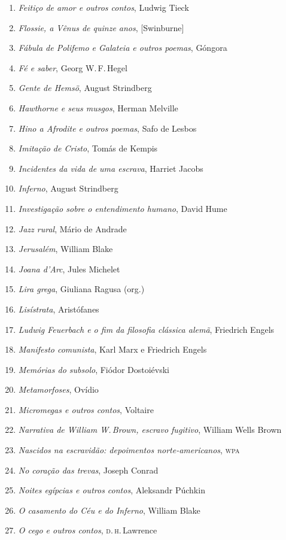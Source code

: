 \begin{enumerate}
\item \textit{Feitiço de amor e outros contos}, Ludwig Tieck
\item \textit{Flossie, a Vênus de quinze anos}, [Swinburne]
\item \textit{Fábula de Polifemo e Galateia e outros poemas}, Góngora
\item \textit{Fé e saber}, Georg W.\,F.\,Hegel
\item \textit{Gente de Hemsö}, August Strindberg 
\item \textit{Hawthorne e seus musgos}, Herman Melville
\item \textit{Hino a Afrodite e outros poemas}, Safo de Lesbos
\item \textit{Imitação de Cristo}, Tomás de Kempis
\item \textit{Incidentes da vida de uma escrava}, Harriet Jacobs
\item \textit{Inferno}, August Strindberg
\item \textit{Investigação sobre o entendimento humano}, David Hume
\item \textit{Jazz rural}, Mário de Andrade
\item \textit{Jerusalém}, William Blake
\item \textit{Joana d'Arc}, Jules Michelet
\item \textit{Lira grega}, Giuliana Ragusa (org.)
\item \textit{Lisístrata}, Aristófanes
\item \textit{Ludwig Feuerbach e o fim da filosofia clássica alemã}, Friedrich Engels
\item \textit{Manifesto comunista}, Karl Marx e Friedrich Engels
\item \textit{Memórias do subsolo}, Fiódor Dostoiévski
\item \textit{Metamorfoses}, Ovídio
\item \textit{Micromegas e outros contos}, Voltaire
\item \textit{Narrativa de William W.\,Brown, escravo fugitivo}, William Wells Brown
\item \textit{Nascidos na escravidão: depoimentos norte-americanos}, \textsc{wpa}
\item \textit{No coração das trevas}, Joseph Conrad
\item \textit{Noites egípcias e outros contos}, Aleksandr Púchkin
\item \textit{O casamento do Céu e do Inferno}, William Blake
\item \textit{O cego e outros contos}, \textsc{d.\,h}.\,Lawrence

\end{enumerate}
